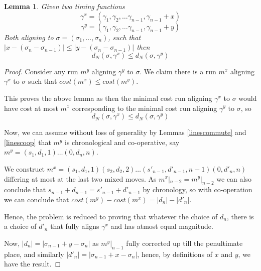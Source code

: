 \documentclass[conference]{IEEEtran}
\newtheorem{lemma}[theorem]{Lemma}
\begin{document}
\begin{lemma}\label{cooplast}
Given two timing functions $$\gamma^x = (\gamma_1, \gamma_2, \dots \gamma_{n-1}, \gamma_{n-1} + x)$$ $$\gamma^y = (\gamma_1, \gamma_2, \dots \gamma_{n-1}, \gamma_{n-1} + y)$$ Both aligning to $\sigma = (\sigma_1, \dots, \sigma_n)$, such that $|x - (\sigma_n - \sigma_{n-1})| \leq |y - (\sigma_n - \sigma_{n-1})|$ then $$d_N(\sigma, \gamma^x) \leq d_N(\sigma, \gamma^y)$$ 
\end{lemma}

\begin{proof}
Consider any run $m^y$ aligning $\gamma^y$ to $\sigma$. 
We claim there is a run $m^x$ aligning $\gamma^x$ to $\sigma$ such that $cost(m^x) \leq cost(m^y)$. 

This proves the above lemma as then the minimal cost run aligning $\gamma^x$ to $\sigma$ would have cost at most $m^x$ corresponding to the minimal cost run aligning $\gamma^y$ to $\sigma$, so $$d_N(\sigma, \gamma^x) \leq d_N(\sigma, \gamma^y)$$

Now, we can assume without loss of generality by Lemmas \ref{linescommute} and \ref{linescoop}  that $m^y$ is chronological and co-operative, say $m^y = (s_1, d_1, 1) \dots (0, d_n, n)$. 

We construct $m^x = (s_1, d_1, 1)(s_2, d_2, 2)\dots (s'_{n-1}, d'_{n-1}, n-1)(0, d'_n, n)$ differing at most at the last two mixed moves. 
As $m^x|_{n-2} = m^y|_{n-2}$ we can also conclude that $s_{n-1} + d_{n-1} = s'_{n-1} + d'_{n-1}$ by chronology, so with co-operation we can conclude that $cost(m^y) - cost(m^x) = |d_n| - |d'_n|$. 

Hence, the problem is reduced to proving that whatever the choice of $d_n$, there is a choice of $d'_n$ that fully aligns $\gamma^x$ and has atmost equal magnitude. 

Now, $|d_n| = |\sigma_{n-1} + y - \sigma_n|$ as $m^y|_{n-1}$ fully corrected up till the penultimate place, and similarly $|d'_n| = |\sigma_{n-1} + x - \sigma_n|$, hence, by definitions of $x$ and $y$, we have the result. 

\end{proof}
\end{document}
